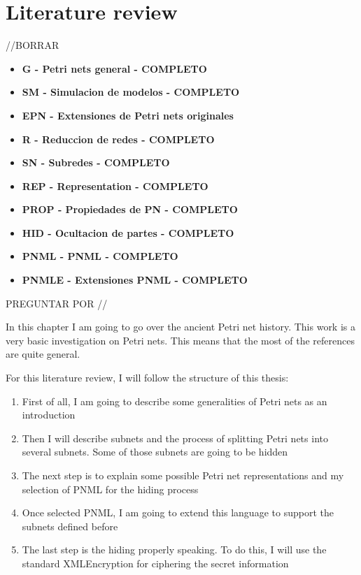 
\chapter{Literature review} %

\label{Chapter:LiteratureReview} %


//BORRAR

\begin{itemize}
 \item \textbf{G - Petri nets general - COMPLETO}
 \item \textbf{SM - Simulacion de modelos
- COMPLETO} \item \textbf{EPN - Extensiones de Petri nets originales
} \item \textbf{R - Reduccion de redes
- COMPLETO} \item \textbf{SN - Subredes
- COMPLETO }\item \textbf{REP - Representation - COMPLETO}
 \item \textbf{PROP - Propiedades de PN - COMPLETO}
 \item \textbf{HID - Ocultacion de partes
- COMPLETO} \item \textbf{PNML - PNML
- COMPLETO }\item \textbf{PNMLE - Extensiones PNML
- COMPLETO}
\end{itemize}


PREGUNTAR POR \cite{EPN-Campos1992352}
\cite{EPN-SM-Latorre2010152}
//

In this chapter I am going to go over the ancient Petri net history. 
This work is a very basic investigation 
on Petri nets. This means that the most of the references are quite general.

For this literature review, I will follow the structure of this thesis:

\begin{enumerate}
\item First of all, I am going to describe some generalities of Petri nets
as an introduction
\item Then I will describe subnets and the process of splitting Petri nets
into several subnets. Some of those subnets are going to be hidden 
\item The next step is to explain some possible Petri net representations
and my selection of PNML for the hiding process
\item Once selected PNML, I am going to extend this language to support the
subnets defined before
\item The last step is the hiding properly speaking. To do this, I will use the standard XMLEncryption for ciphering the secret information
\end{enumerate}

